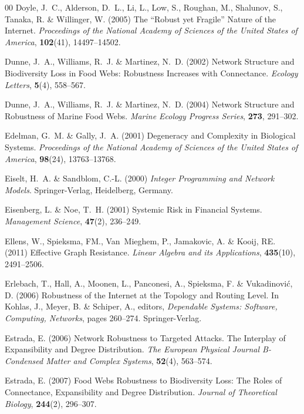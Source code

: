 \documentclass{comnet-mod}
\begin{document}
\begin{thebibliography}{00}
Doyle, J.~C., Alderson, D.~L., Li, L., Low, S., Roughan, M., Shalunov, S.,
  Tanaka, R. {\&} Willinger, W. (2005)  {The ``Robust yet Fragile'' Nature of
  the {{Internet}}}. {\em {Proceedings of the National Academy of Sciences of
  the United States of America}}, \textbf{102}(41), 14497--14502.

Dunne, J.~A., Williams, R.~J. {\&} Martinez, N.~D. (2002)  {Network Structure
  and Biodiversity Loss in Food Webs: {{Robustness}} Increases with
  Connectance}. {\em {Ecology Letters}}, \textbf{5}(4), 558--567.

Dunne, J.~A., Williams, R.~J. {\&} Martinez, N.~D. (2004)  {Network Structure
  and Robustness of Marine Food Webs}. {\em {Marine Ecology Progress Series}},
  \textbf{273}, 291--302.

Edelman, G.~M. {\&} Gally, J.~A. (2001)  {Degeneracy and Complexity in
  Biological Systems}. {\em {Proceedings of the National Academy of Sciences of
  the United States of America}}, \textbf{98}(24), 13763--13768.

Eiselt, H.~A. {\&} Sandblom, C.-L. (2000) {\em {Integer Programming and Network
  Models}}.
{Springer-Verlag}, {Heidelberg, Germany}.

Eisenberg, L. {\&} Noe, T.~H. (2001)  {Systemic Risk in Financial Systems}.
  {\em {Management Science}}, \textbf{47}(2), 236--249.

Ellens, W., Spieksma, {\relax FM}., Van~Mieghem, P., Jamakovic, A. {\&} Kooij,
  {\relax RE}. (2011)  {Effective Graph Resistance}. {\em {Linear Algebra and
  its Applications}}, \textbf{435}(10), 2491--2506.

Erlebach, T., Hall, A., Moonen, L., Panconesi, A., Spieksma, F. {\&}
  Vukadinovi{\'c}, D. (2006)  {Robustness of the Internet at the Topology and
  Routing Level}. In Kohlas, J., Meyer, B. {\&} Schiper, A., editors, {\em
  {Dependable Systems: {{Software}}, Computing, Networks}}, pages 260--274.
  {Springer-Verlag}.

Estrada, E. (2006)  {Network Robustness to Targeted Attacks. {{The}} Interplay
  of Expansibility and Degree Distribution}. {\em {The European Physical
  Journal B-Condensed Matter and Complex Systems}}, \textbf{52}(4), 563--574.

Estrada, E. (2007)  {Food Webs Robustness to Biodiversity Loss: {{The}} Roles
  of Connectance, Expansibility and Degree Distribution}. {\em {Journal of
  Theoretical Biology}}, \textbf{244}(2), 296--307.


\end{thebibliography}
\end{document}

